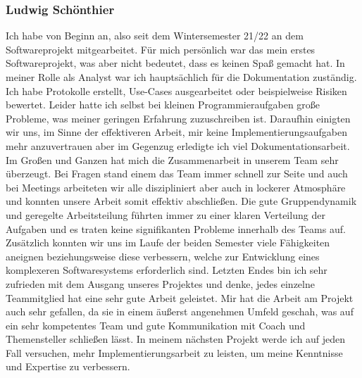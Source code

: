 \documentclass[10pt]{article}
\begin{document}
\subsubsection{Ludwig Schönthier}
    Ich habe von Beginn an, also seit dem Wintersemester 21/22 an dem Softwareprojekt mitgearbeitet. Für mich persönlich war das mein erstes Softwareprojekt,
    was aber nicht bedeutet, dass es keinen Spaß gemacht hat. In meiner Rolle als Analyst war ich hauptsächlich für die Dokumentation zuständig. Ich habe Protokolle
    erstellt, Use-Cases ausgearbeitet oder beispielweise Risiken bewertet. Leider hatte ich selbst bei kleinen Programmieraufgaben große Probleme, was meiner geringen
    Erfahrung zuzuschreiben ist. Daraufhin einigten wir uns, im Sinne der effektiveren Arbeit, mir keine Implementierungsaufgaben mehr anzuvertrauen aber im Gegenzug
    erledigte ich viel Dokumentationsarbeit.
    Im Großen und Ganzen hat mich die Zusammenarbeit in unserem Team sehr überzeugt. Bei Fragen stand einem das Team immer schnell zur Seite und auch bei Meetings
    arbeiteten wir alle diszipliniert aber auch in lockerer Atmosphäre und konnten unsere Arbeit somit effektiv abschließen. Die gute Gruppendynamik und geregelte
    Arbeitsteilung führten immer zu einer klaren Verteilung der Aufgaben und es traten keine signifikanten Probleme innerhalb des Teams auf. Zusätzlich konnten wir uns
    im Laufe der beiden Semester viele Fähigkeiten aneignen beziehungsweise diese verbessern, welche zur Entwicklung eines komplexeren Softwaresystems erforderlich sind.
        Letzten Endes bin ich sehr zufrieden mit dem Ausgang unseres Projektes und denke, jedes einzelne Teammitglied hat eine sehr gute Arbeit geleistet. Mir hat die
    Arbeit am Projekt auch sehr gefallen, da sie in einem äußerst angenehmen Umfeld geschah, was auf ein sehr kompetentes Team und gute Kommunikation mit Coach und
    Themensteller schließen lässt. In meinem nächsten Projekt werde ich auf jeden Fall versuchen, mehr Implementierungsarbeit zu leisten, um meine Kenntnisse und
    Expertise zu verbessern.
\end{document}
